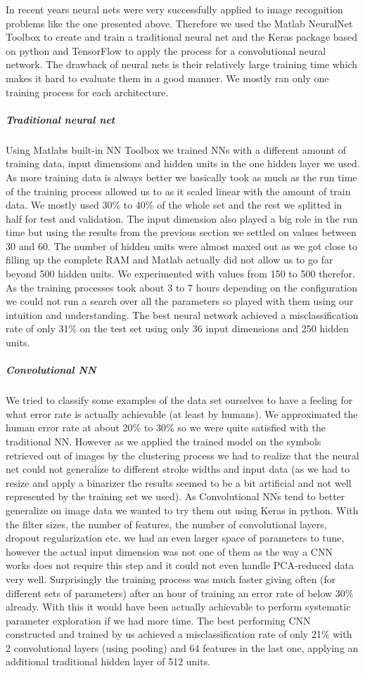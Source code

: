 \documentclass[twocolumn]{article}%
\begin{document}
	In recent years neural nets were very successfully applied to image recognition problems like the one presented above. Therefore we used the Matlab NeuralNet Toolbox to create and train a traditional neural net and the Keras package based on python and TensorFlow to apply the process for a convolutional neural network. The drawback of neural nets is their relatively large training time which makes it hard to evaluate them in a good manner. We mostly ran only one training process for each architecture.
	\subparagraph{Traditional neural net}
	Using Matlabs built-in NN Toolbox we trained NNs with a different amount of training data, input dimensions and hidden units in the one hidden layer we used. As more training data is always better we basically took as much as the run time of the training process allowed us to as it scaled linear with the amount of train data. We mostly used 30\% to 40\% of the whole set and the rest we splitted in half for test and validation. The input dimension also played a big role in the run time but using the results from the previous section we settled on values between 30 and 60. The number of hidden units were almost maxed out as we got close to filling up the complete RAM and Matlab actually did not allow us to go far beyond 500 hidden units. We experimented with values from 150 to 500 therefor. As the training processes took about 3 to 7 hours depending on the configuration we could not run a search over all the parameters so played with them using our intuition and understanding. The best neural network achieved a misclassification rate of only 31\% on the test set using only 36 input dimensions and 250 hidden units.
	\subparagraph{Convolutional NN}
	We tried to classify some examples of the data set ourselves to have a feeling for what error rate is actually achievable (at least by humans). We approximated the human error rate at about 20\% to 30\% so we were quite satisfied with the traditional NN. However as we applied the trained model on the symbols retrieved out of images by the clustering process we had to realize that the neural net could not generalize to different stroke widths and input data (as we had to resize and apply a binarizer the results seemed to be a bit artificial and not well represented by the training set we used). As Convolutional NNs tend to better generalize on image data \cite{lenet} we wanted to try them out using Keras \cite{keras} in python. With the filter sizes, the number of features, the number of convolutional layers, dropout regularization etc. we had an even larger space of parameters to tune, however the actual input dimension was not one of them as the way a CNN works does not require this step and it could not even handle PCA-reduced data very well. Surprisingly the training process was much faster giving often (for different sets of parameters) after an hour of training an error rate of below 30\% already. With this it would have been actually achievable to perform systematic parameter exploration if we had more time. The best performing CNN constructed and trained by us achieved a misclassification rate of only 21\% with 2 convolutional layers (using pooling) and 64 features in the last one, applying an additional traditional hidden layer of 512 units.
	
\end{document}
